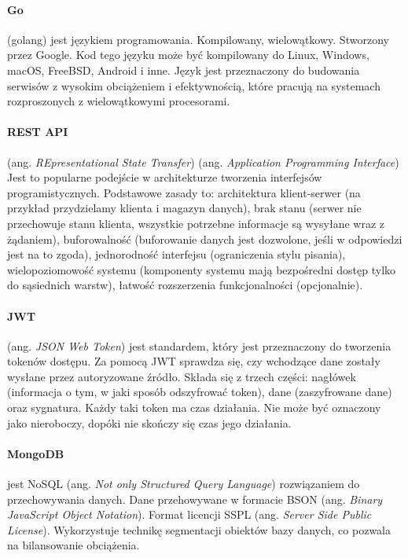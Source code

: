 \paragraph{Go} (golang) \cite{golang1,golang2,golang3,godoc} jest językiem programowania. Kompilowany, wielowątkowy. Stworzony przez Google. Kod tego języku może być kompilowany do Linux, Windows, macOS, FreeBSD, Android i inne.
Język jest przeznaczony do budowania serwisów z wysokim obciążeniem i efektywnością, które pracują na systemach rozproszonych z wielowątkowymi procesorami.

\paragraph{REST API} (ang. \textit{REpresentational State Transfer}) (ang. \textit{Application Programming Interface}) \cite{rest_api,rest_api_best} Jest to popularne podejście w architekturze tworzenia interfejsów programistycznych.
Podstawowe zasady to: architektura klient-serwer (na przykład przydzielamy klienta i magazyn danych), brak stanu (serwer nie przechowuje stanu klienta, wszystkie potrzebne informacje są wysyłane wraz z żądaniem),
buforowalność (buforowanie danych jest dozwolone, jeśli w odpowiedzi jest na to zgoda), jednorodność interfejsu (ograniczenia stylu pisania), wielopoziomowość systemu (komponenty systemu mają bezpośredni dostęp tylko do sąsiednich warstw), łatwość rozszerzenia funkcjonalności (opcjonalnie).

\paragraph{JWT} (ang. \textit{JSON Web Token}) \cite{jwt} jest standardem, który jest przeznaczony do tworzenia tokenów dostępu. Za pomocą JWT sprawdza się, czy wchodzące dane zostały wysłane przez autoryzowane źródło.
Składa się z trzech części: nagłówek (informacja o tym, w jaki sposób odszyfrować token), dane (zaszyfrowane dane) oraz sygnatura. Każdy taki token ma czas działania. Nie może być oznaczony jako nieroboczy, dopóki nie skończy się czas jego działania.

\paragraph{MongoDB} \cite{mongoDB,mongoDB_doc,mongodb_habr} jest NoSQL (ang. \textit{Not only Structured Query Language}) rozwiązaniem do przechowywania danych. Dane przehowywane w formacie BSON (ang. \textit{Binary JavaScript Object Notation}).
Format licencji SSPL (ang. \textit{Server Side Public License}). Wykorzystuje technikę segmentacji obiektów bazy danych, co pozwala na bilansowanie obciążenia.

